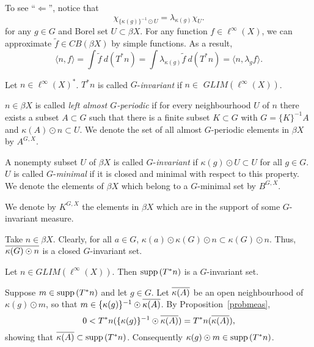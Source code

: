 To see ``$\Leftarrow$'', notice that
\[
\chi_{\{\kappa(g)\}^{-1}\odot U} = \lambda_{\kappa(g)}\chi_U.
\]
for any $g\in G$ and Borel set $U\subset \beta X$.  For any function $f\in\ell^\infty(X)$,
we can approximate $\tilde{f}\in CB(\beta X)$ by simple functions.
As a result,
\[
\langle n, f\rangle = \int\tilde{f}\:d(T^*n) = \int\lambda_{\kappa(g)}\tilde{f}\:d(T^*n) = \langle n, \lambda_g f \rangle.
\]
\done

\begin{defn}
Let $n\in \ell^\infty(X)^*$.  $T^*n$ is called $G$-{\it invariant} if $n \in$ \linebreak $GLIM(\ell^\infty(X))$.
\end{defn}

\begin{defn}
$n \in \beta X$ is called {\it left almost $G$-periodic} if for every neighbourhood $U$ of $n$
there exists a subset $A \subset G$ such that there is a finite subset $K \subset G$ with
$G = \{K\}^{-1}A$ and $\kappa(A) \odot n \subset U$.  We denote the set of all almost
$G$-periodic elements in $\beta X$ by $A^{G,X}$.
\end{defn}

\begin{defn}
A nonempty subset $U$ of $\beta X$ is called $G$-{\it invariant} if $\kappa(g) \odot U \subset U$ for all
$g\in G$.  $U$ is called $G$-{\it minimal} if it is closed and minimal with respect to this property.
We denote the elements of $\beta X$ which belong to a $G$-minimal set by $B^{G,X}$.
\end{defn}

We denote by $K^{G,X}$ the elements in $\beta X$ which are in the support of some $G$-invariant
measure.

\begin{example}
Take $n\in \beta X$.  Clearly, for all $a\in G$,
$\kappa(a) \odot \kappa(G) \odot n \subset \kappa(G) \odot n$.  Thus, $\overline{\kappa(G) \odot n}$
is a closed $G$-invariant set.
\end{example}

\begin{proposition}\label{fairchild2.1}
Let $n\in GLIM(\ell^\infty(X))$.  Then $\operatorname{supp\,} (T^*n)$ is a \linebreak$G$-invariant set.
\end{proposition}
\proof
Suppose $m \in \operatorname{supp\,} (T^*n)$ and let $g\in G$.  Let $\overline{\kappa(A)}$ be an open neighbourhood
of $\kappa(g) \odot m$, so that $m\in \{\kappa(g)\}^{-1} \odot \overline{\kappa(A)}$.  By Proposition~\ref{probmeas},
\[
0 < T^*n (\{\kappa(g)\}^{-1} \odot \overline{\kappa(A)}) = T^*n (\overline{\kappa(A)}),
\]
showing that $\overline{\kappa(A)}\subset \operatorname{supp\,} (T^*n)$.  Consequently $\kappa(g) \odot m \in \operatorname{supp\,} (T^*n)$.
\done

